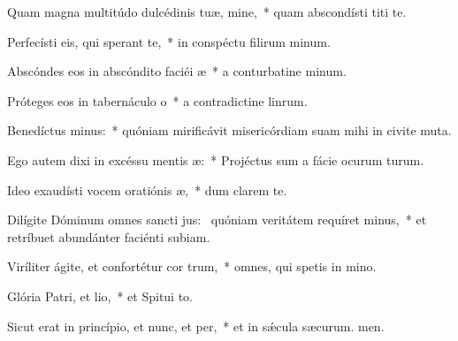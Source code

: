 \item Quam magna multitúdo dulcédinis tuæ, mine,~* quam abscondísti titi te.
\item Perfecísti eis, qui sperant  te,~* in conspéctu filirum minum.
\item Abscóndes eos in abscóndito faciéi æ~* a conturbatine minum.
\item Próteges eos in tabernáculo o~* a contradictine linrum.
\item Benedíctus minus:~* quóniam mirificávit misericórdiam suam mihi in civite muta.
\item Ego autem dixi in excéssu mentis æ:~* Projéctus sum a fácie ocurum turum.
\item Ideo exaudísti vocem oratiónis æ,~* dum clarem  te.
\item Dilígite Dóminum omnes sancti jus:~\pscross{} quóniam veritátem requíret minus,~* et retríbuet abundánter faciénti subiam.
\item Viríliter ágite, et confortétur cor trum,~* omnes, qui spetis in mino.
\item Glória Patri, et lio,~* et Spitui to.
\item Sicut erat in princípio, et nunc, et per,~* et in sǽcula sæcurum. men.
